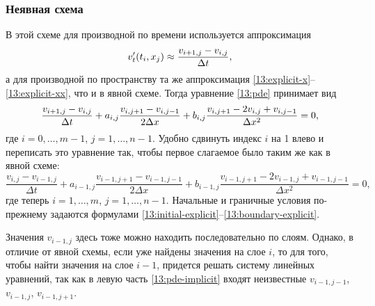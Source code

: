 \subsubsection*{Неявная схема}
В этой схеме для производной по времени используется аппроксимация
\[
v'_t(t_i, x_j) \approx \frac{v_{i+1,j} - v_{i,j}}{\Delta t},\\
\]
а для производной по пространству та же аппроксимация \eqref{13:explicit-x}--\eqref{13:explicit-xx}, что и в явной схеме.
Тогда уравнение \eqref{13:pde} принимает вид
\[
\frac{v_{i+1,j} - v_{i,j}}{\Delta t} + a_{i,j} \frac{v_{i,j+1} - v_{i,j-1}}{2\Delta x} + b_{i,j} \frac{v_{i,j+1} - 2v_{i,j} + v_{i,j-1}}{\Delta x^2} = 0,\\
\]
где $i=0,\ldots,m-1$, $j=1,\ldots,n-1$.
Удобно сдвинуть индекс $i$ на 1 влево и переписать это уравнение так, чтобы первое слагаемое было таким же как в явной схеме:
\begin{equation}
\label{13:pde-implicit}
\frac{v_{i,j} - v_{i-1,j}}{\Delta t} + a_{i-1,j} \frac{v_{i-1,j+1} - v_{i-1,j-1}}{2\Delta x} + b_{i-1,j} \frac{v_{i-1,j+1} - 2v_{i-1,j} + v_{i-1,j-1}}{\Delta x^2} = 0,
\end{equation}
где теперь $i=1,\ldots,m$, $j=1,\ldots,n-1$.
Начальные и граничные условия по-прежнему задаются формулами \eqref{13:initial-explicit}--\eqref{13:boundary-explicit}.

Значения $v_{i-1,j}$ здесь тоже можно находить последовательно по слоям.
Однако, в отличие от явной схемы, если уже найдены значения на слое $i$, то для того, чтобы найти значения на слое $i-1$, придется решать систему линейных уравнений, так как в левую часть \eqref{13:pde-implicit} входят неизвестные $v_{i-1,j-1}$, $v_{i-1,j}$, $v_{i-1,j+1}$. 

